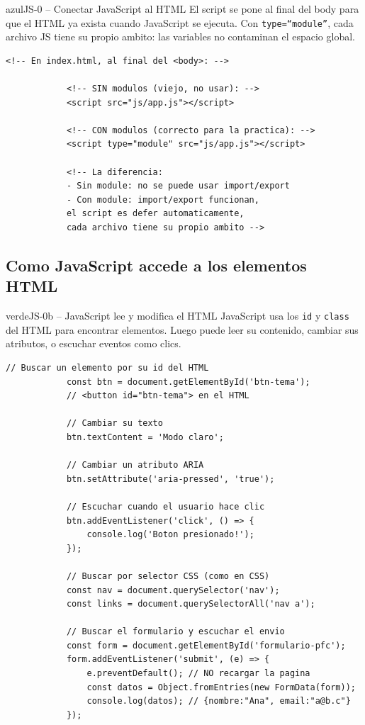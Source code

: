 \documentclass[11pt,a4paper]{article}
\begin{document}
	\begin{cajacodigo}{azul}{JS-0 -- Conectar JavaScript al HTML}
		{\color{codigotexto}\small El script se pone al final del body para que el HTML ya exista cuando JavaScript se ejecuta. Con \texttt{type=``module''}, cada archivo JS tiene su propio ambito: las variables no contaminan el espacio global.}
		\begin{lstlisting}[style=codehtml]
			<!-- En index.html, al final del <body>: -->
			
			<!-- SIN modulos (viejo, no usar): -->
			<script src="js/app.js"></script>
			
			<!-- CON modulos (correcto para la practica): -->
			<script type="module" src="js/app.js"></script>
			
			<!-- La diferencia:
			- Sin module: no se puede usar import/export
			- Con module: import/export funcionan,
			el script es defer automaticamente,
			cada archivo tiene su propio ambito -->
		\end{lstlisting}
	\end{cajacodigo}
	
	\subsection{Como JavaScript accede a los elementos HTML}
	
	\begin{cajacodigo}{verde}{JS-0b -- JavaScript lee y modifica el HTML}
		{\color{codigotexto}\small JavaScript usa los \texttt{id} y \texttt{class} del HTML para encontrar elementos. Luego puede leer su contenido, cambiar sus atributos, o escuchar eventos como clics.}
		\begin{lstlisting}[style=codejs]
			// Buscar un elemento por su id del HTML
			const btn = document.getElementById('btn-tema');
			// <button id="btn-tema"> en el HTML
			
			// Cambiar su texto
			btn.textContent = 'Modo claro';
			
			// Cambiar un atributo ARIA
			btn.setAttribute('aria-pressed', 'true');
			
			// Escuchar cuando el usuario hace clic
			btn.addEventListener('click', () => {
				console.log('Boton presionado!');
			});
			
			// Buscar por selector CSS (como en CSS)
			const nav = document.querySelector('nav');
			const links = document.querySelectorAll('nav a');
			
			// Buscar el formulario y escuchar el envio
			const form = document.getElementById('formulario-pfc');
			form.addEventListener('submit', (e) => {
				e.preventDefault(); // NO recargar la pagina
				const datos = Object.fromEntries(new FormData(form));
				console.log(datos); // {nombre:"Ana", email:"a@b.c"}
			});
		\end{lstlisting}
	\end{cajacodigo}
	
\end{document}
